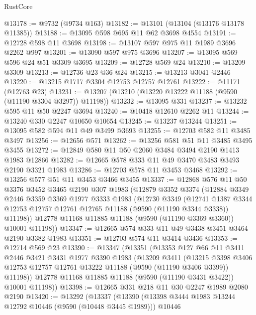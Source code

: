 \begin{lexlean}{RustCore}
\begin{coremodule}
@13178 := @9732 (@9734 @163)
@13182 := @13101 (@13104 (@13176 @13178 @11385))
@13188 := @13095 @598 @695 @11 @62 @3698 @4554
@13191 := @12728 @598 @11 @3698
@13198 := @13107 @597 @975 @11 @1989 @3696 @2262 @997
@13201 := @13090 @597 @975 @3696
@13207 := @13095 @569 @596 @24 @51 @3309 @3695
@13209 := @12728 @569 @24
@13210 := @13209 @3309
@13213 := @12736 @23 @36 @24
@13215 := @13213 @3041 @2446
@13220 := @13215 @1717 @3304 @12753 @12757 @12761
@13222 := @11171 (@12763 @23)
@13231 := @13207 (@13210 (@13220 @13222 @11188 (@9590 (@11190 @3304 @3297)) @11198))
@13232 := @13095 @331
@13237 := @13232 @595 @11 @50 @2247 @3694
@13240 := @10418 @12610 @2262 @11
@13244 := @13240 @330 @2247 @10650 @10654
@13245 := @13237 @13244
@13251 := @13095 @582 @594 @11 @49 @3499 @3693
@13255 := @12703 @582 @11 @3485 @3497
@13256 := @12656 @571
@13262 := @13256 @581 @51 @11 @3485 @3495 @3455
@13272 := @12849 @580 @11 @50 @2060 @3484 @3494 @2190 @1413 @1983 @12866
@13282 := @12665 @578 @333 @11 @49 @3470 @3483 @3493 @2190 @3321 @1983
@13286 := @12703 @578 @11 @3453 @3468
@13292 := @13256 @577 @51 @11 @3453 @3466 @3455
@13337 := @12868
    @576
    @11
    @50
    @3376
    @3452
    @3465
    @2190
    @307
    @1983
    (@12879
      @3352
      @3374
      (@12884
        @3349
        @2446
        @3359
        @3369
        @1977
        @3333
        @1983
        (@12730
          @3349
          (@12741
            @1387
            @3344
            @12753
            @12757
            @12761
            @12765
            @11188
            (@9590 (@11190 @3344 @3338))
            @11198))
        @12778
        @11168
        @11885
        @11188
        (@9590 (@11190 @3369 @3360))
        @10001
        @11198))
@13347 := @12665 @574 @333 @11 @49 @3438 @3451 @3464 @2190 @3382 @1983
@13351 := @12703 @574 @11 @3414 @3436
@13353 := @12714 @569 @23
@13390 := @13347
    (@13351
      (@13353
        @127
        @66
        @11
        @3411
        @2446
        @3421
        @3431
        @1977
        @3390
        @1983
        (@13209
          @3411
          (@13215
            @3398
            @3406
            @12753
            @12757
            @12761
            @13222
            @11188
            (@9590 (@11190 @3406 @3399))
            @11198))
        @12778
        @11168
        @11885
        @11188
        (@9590 (@11190 @3431 @3422))
        @10001
        @11198))
@13398 := @12665 @331 @218 @11 @30 @2247 @1989 @2080 @2190
@13420 := @13292
    (@13337
      (@13390
        (@13398 @3444 @1983 @13244 @12792 @10446 (@9590 (@10448 @3445 @1989)))
        @10446

\end{coremodule}
\end{lexlean}
